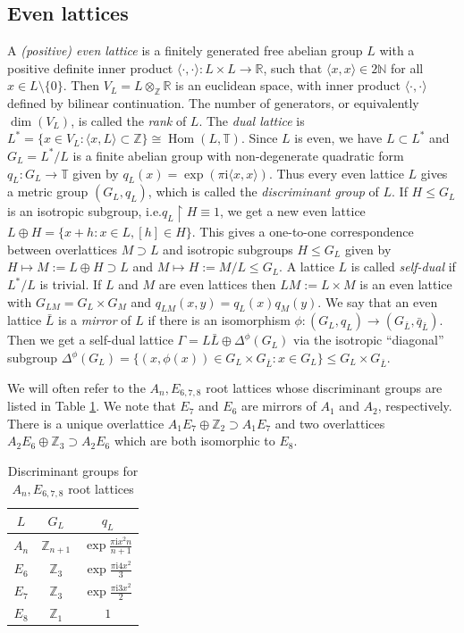 \documentclass[twoside,11pt,reqno]{amsart}
\makeatletter
\theoremstyle{definition}
\theoremstyle{remark}
\newcommand{\RR}{\mathbb{R}}
\newcommand{\TT}{\mathbb{T}}
\newcommand{\ZZ}{\mathbb{Z}}
\newcommand{\NN}{\mathbb{N}}
\DeclareMathOperator{\Hom}{Hom}
\newcommand{\ima}{\mathrm{i}}
\DeclareRobustCommand{\ie}{i.e.\@\xspace}
\newcommand{\bi}[2]{\langle #1,#2\rangle}
\newcommand{\bislotslot}{\bi\cdot\cdot}
\newcommand{\lattimes}{}%
\newcommand{\myemph}[1]{\emph{#1}}
\makeatother
\begin{document}
\subsection{Even lattices}
A \myemph{(positive) even lattice} is a finitely generated free abelian group 
$L$ with a positive definite inner product 
$\bislotslot\colon L\times L \to \RR$, such that $\langle x,x\rangle \in 2\NN$
for all $x\in L\setminus \{0\}$.
Then $V_L=L\otimes_\ZZ\RR$ is an euclidean space, with inner product 
$\bislotslot$ defined by bilinear continuation. 
The number of generators, or equivalently $\dim(V_L)$, is called the 
\myemph{rank} of $L$.
The \myemph{dual lattice} is 
$L^\ast=\{x\in V_L: \bi x L \subset \ZZ\}\cong \Hom(L,\TT)$. 
Since $L$ is even, we have $L\subset L^\ast$ and $G_L=L^\ast/L$ is a finite 
abelian group with non-degenerate quadratic form $q_L\colon G_L\to \TT$ given by
$q_L(x)=\exp(\pi \ima \bi xx)$. 
Thus every even lattice $L$ gives a metric group $(G_L,q_L)$, which is called
the \myemph{discriminant group} of $L$.
If $H\leq G_L$ is an isotropic subgroup, \ie $q_L\restriction H\equiv 1$, we get
a new even lattice $L\oplus H=\{x+h : x\in L, [h]\in H\}$.
This gives a one-to-one correspondence between overlattices $M\supset L$ and 
isotropic subgroups $H\leq G_L$ given by $H\mapsto M:=L\oplus H\supset L$ and 
$M\mapsto H:= M/L\leq G_L$. 
A lattice $L$ is called \myemph{self-dual} if $L^\ast/L$ is trivial.
If $L$ and $M$ are even lattices then $L\lattimes M:=L\times M$ is an even 
lattice with $G_{L\lattimes M}=G_L\times G_M$ and 
$q_{L\lattimes M}(x, y)=q_L(x)q_M(y)$.
We say that an even lattice $\bar L$ is a \myemph{mirror} of $L$ if there is an
isomorphism $\phi\colon(G_L,q_L) \to (G_{\bar L},\bar q_{\bar L})$. 
Then we get a self-dual lattice $\Gamma=L\bar L\oplus \Delta^\phi(G_L)$ via the 
isotropic ``diagonal'' subgroup 
$\Delta^\phi(G_L)=\{(x,\phi(x))\in  G_L\times G_{\bar L}  : x\in G_L\}\leq
G_L\times G_{\bar L}$. 

We will often refer to the $A_n, E_{6,7,8}$ root lattices whose 
discriminant groups are listed in Table \ref{tab:lattices}. 
We note that $E_7$ and $E_6$ are mirrors of $A_1$ and $A_2$, respectively. 
There is a unique overlattice 
$A_1 \lattimes E_7\oplus \ZZ_2\supset A_1\lattimes E_7$ and two 
overlattices $A_2\lattimes E_6\oplus \ZZ_3\supset A_2\lattimes E_6$ 
which are both isomorphic to $E_8$.
\begin{table}[h]
  \begin{tabular}{c|c|c}
    $L$ & $G_L$ & $q_L$\\\hline
    $A_{n}$  & $\ZZ_{n+1}$ & $\exp{\frac{\pi \ima x^2n}{n+1}}$\\
    $E_6$  & $\ZZ_3$ & $\exp{\frac{\pi \ima 4 x^2}{3}}$\\
    $E_7$  & $\ZZ_3$ & $\exp{\frac{\pi \ima 3 x^2}{2}}$\\
    $E_8$  & $\ZZ_1$ & $1$
  \end{tabular}
  \caption{Discriminant groups for $A_n, E_{6,7,8}$  root lattices}
  \label{tab:lattices}
\end{table}
\end{document}
